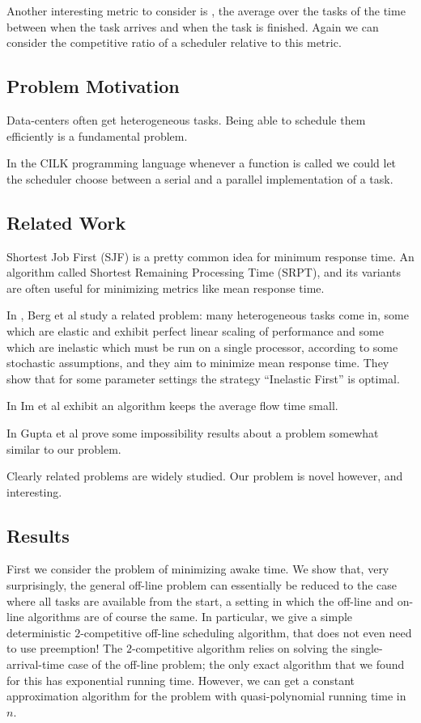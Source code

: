 Another interesting metric to consider is , the average over the tasks of the time between when the
task arrives and when the task is finished. Again we can consider
the competitive ratio of a scheduler relative to this metric.

\subsection{Problem Motivation}
Data-centers often get heterogeneous tasks. Being able to schedule
them efficiently is a fundamental problem. 

In the CILK programming language whenever a function is called we
could let the scheduler choose between a serial and a parallel
implementation of a task. 

\subsection{Related Work}
Shortest Job First (SJF) is a pretty common idea for minimum response time. 
An algorithm called Shortest Remaining Processing Time (SRPT),
and its variants are often useful for minimizing metrics like mean
response time.

In \cite{bb20}, Berg et al study a related problem:
many heterogeneous tasks come in, some which are elastic and
exhibit perfect linear scaling of performance and some which are
inelastic which must be run on a single processor, according to
some stochastic assumptions, and they aim to minimize mean
response time. They show that for some parameter settings the
strategy \enquote{Inelastic First} is optimal.

In \cite{is16} Im et al exhibit an algorithm keeps the average
flow time small. 

In \cite{ga12} Gupta et al prove some impossibility results about
a problem somewhat similar to our problem.

Clearly related problems are widely studied.
Our problem is novel however, and interesting.

\subsection{Results}
First we consider the problem of minimizing awake time. We show
that, very surprisingly, the general off-line problem can
essentially be reduced to the case where all tasks are available
from the start, a setting in which the off-line and on-line
algorithms are of course the same. In particular, we give a
simple deterministic $2$-competitive off-line scheduling
algorithm, that does not even need to use preemption! 
The $2$-competitive algorithm relies on solving the
single-arrival-time case of the off-line problem; the only exact
algorithm that we found for this has exponential running time.
However, we can get a constant approximation algorithm for the
problem with quasi-polynomial running time in $n$.

